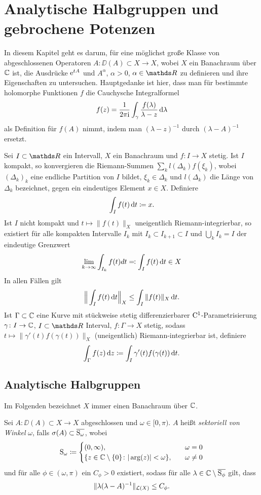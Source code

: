 \chapter{Analytische Halbgruppen und gebrochene Potenzen}

In diesem Kapitel geht es darum, für eine möglichst große Klasse von abgeschlossenen Operatoren $A \colon \DD(A) \subset X \to X$, wobei $X$ ein Banachraum über $\mathbb{C}$ ist, die Ausdrücke $\mathrm{e}^{tA}$ und $A^\alpha$, $\alpha > 0$, $\alpha \in \R$ zu definieren und ihre Eigenschaften zu untersuchen.
Hauptgedanke ist hier, dass man für bestimmte holomorphe Funktionen $f$ die Cauchysche Integralformel
$$
f(z) = \frac{1}{2\pi \mathrm{i}} \int_\gamma \frac{f(\lambda)}{\lambda - z} \, {\operatorname{d}\!{\lambda}}
$$
als Definition für $f(A)$ nimmt, indem man $(\lambda - z)^{-1}$ durch $(\lambda - A)^{-1}$ ersetzt.

Sei $I \subset \R$ ein Intervall, $X$ ein Banachraum und $f \colon I \to X$ stetig.
Ist $I$ kompakt, so konvergieren die Riemann-Summen $\sum_k l(\Delta_k) f(\xi_k)$, wobei $(\Delta_k)_k$ eine endliche Partition von $I$ bildet, $\xi_k \in \Delta_k$ und $l(\Delta_k)$ die Länge von $\Delta_k$ bezeichnet, gegen ein eindeutiges Element $x \in X$.
Definiere
$$
\int_I f(t) \, {\operatorname{d}\!{t}} \coloneqq x.
$$
Ist $I$ nicht kompakt und $t \mapsto \|f(t)\|_X$ uneigentlich Riemann-integrierbar, so existiert für alle kompakten Intervalle $I_k$ mit $I_k \subset I_{k + 1} \subset I$ und $\bigcup_k I_k = I$ der eindeutige Grenzwert
$$
\lim_{k \to \infty} \int_{I_k} f(t) dt \eqqcolon \int_I f(t) \, {\operatorname{d}\!{t}} \in X
$$
In allen Fällen gilt
$$
\Big\| \int_I f(t) \, {\operatorname{d}\!{t}} \Big\|_X \leq \int_I \|f(t) \|_X \, {\operatorname{d}\!{t}}.
$$
Ist $\Gamma \subset \mathbb{C}$ eine Kurve mit stückweise stetig differenzierbarer $\mathrm{C}^1$-Parametrisierung $\gamma \colon I \to \mathbb{C}$, $I \subset \R$ Interval, $f \colon \Gamma \to X$ stetig, sodass $t \mapsto \|\gamma'(t) f(\gamma(t)) \|_X$ (uneigentlich) Riemann-integrierbar ist, definiere
$$
\int_\Gamma f(z) \, {\operatorname{d}\!{z}} \coloneqq \int_I \gamma'(t) f(\gamma(t)) \, {\operatorname{d}\!{t}}.
$$

\section{Analytische Halbgruppen}

Im Folgenden bezeichnet $X$ immer einen Banachraum über $\mathbb{C}$.

\begin{defn}
  Sei $A \colon \DD(A) \subset X \to X$ abgeschlossen und $\omega \in [0,\pi)$.
    $A$ heißt \emph{sektoriell von Winkel} $\omega$, falls $\sigma(A) \subset \overline{\mathrm{S}_\omega}$, wobei
    $$
    \mathrm{S}_\omega \coloneqq \begin{cases} (0,\infty), \quad&\omega = 0 \\ \{z \in \mathbb{C} \setminus\{0\} \colon |\arg(z)| < \omega\}, \quad&\omega \neq 0 \end{cases}
    $$
    und für alle $\phi \in (\omega, \pi)$ ein $C_\phi > 0$ existiert, sodass für alle $\lambda \in \mathbb{C} \setminus \overline{\mathrm{S}_\phi}$ gilt, dass
    $$
    \|\lambda(\lambda - A)^{-1}\|_{\mathcal{L}(X)} \leq C_\phi.
    $$
\end{defn}

